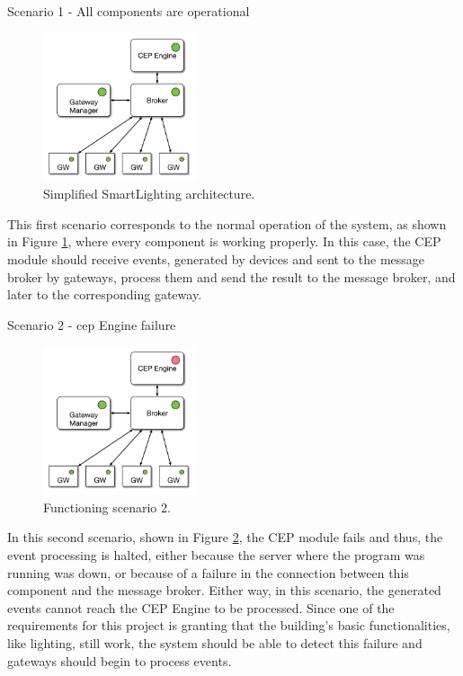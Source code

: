 \begin{Paragraph}{Scenario 1 - All components are operational}
	
	\begin{figure}[H]
		\centering
		\includegraphics[width=0.4\textwidth]{figures/fs1.png}
		\caption{Simplified SmartLighting architecture.}
		\label{fig:sc1}
	\end{figure}
	
	This first scenario corresponds to the normal operation of the system, as shown in Figure \ref{fig:sc1}, where every component is working properly. In this case, the CEP module should receive events, generated by devices and sent to the message broker by gateways, process them and send the result to the message broker, and later to the corresponding gateway. 
	
	
	
\end{Paragraph}

\begin{Paragraph}{Scenario 2 - \ac{cep} Engine failure}
	
		\begin{figure}[H]
		\centering
		\includegraphics[width=0.4\textwidth]{figures/fs2.png}
		\caption{Functioning scenario 2.}
		\label{fig:sc2}
	\end{figure}
	
	In this second scenario, shown in Figure \ref{fig:sc2}, the CEP module fails and thus, the event processing is halted, either because the server where the program was running was down, or because of a failure in the connection between this component and the message broker. Either way, in this scenario, the generated events cannot reach the CEP Engine to be processed. Since one of the requirements for this project is granting that the building's basic functionalities, like lighting, still work, the system should be able to detect this failure and gateways should begin to process events. 
	
\end{Paragraph}

